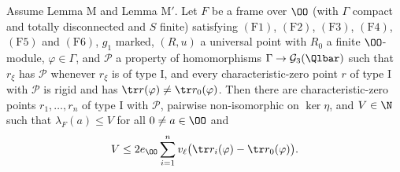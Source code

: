 \begin{proposition}\label{pf:eis:abscount}
Assume Lemma M and Lemma M$'$. Let $F$ be a frame over $\OO$ (with $\Gamma$ compact and totally disconnected and $S$ finite) satisfying
$(\mathrm{F1})$, $(\mathrm{F2})$, $(\mathrm{F3})$, $(\mathrm{F4})$, $(\mathrm{F5})$ and $(\mathrm{F6})$, $g_1$ marked, $(R,u)$ a universal point with $R_0$ a finite
$\OO$-module, $\varphi\in\Gamma$, and $\mathcal P$ a property of homomorphisms $\Gamma\to\eisGG(\Qlbar)$ such that $r_\xi$ has $\mathcal P$ whenever
$r_\xi$ is of type I, and every characteristic-zero point $r$ of type I with $\mathcal P$ is rigid and has $\tr r(\varphi)\ne\tr\eisrz(\varphi)$. Then
there are characteristic-zero points $r_1,\dots,r_n$ of type I with $\mathcal P$, pairwise non-isomorphic on $\ker\eta$, and $V\in\N$ such
that $\lambda_F(a)\le V$ for all $0\ne a\in\OO$ and
\[
 V\le2e_\OO\sum_{i=1}^n\eisv\bigl(\tr r_i(\varphi)-\tr\eisrz(\varphi)\bigr).
\]
\end{proposition}

